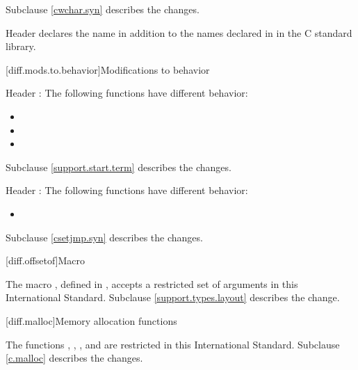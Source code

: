 Subclause \ref{cwchar.syn} describes the changes.

\pnum
Header 
declares the name  in addition to the names declared in
 in the C standard library.

[diff.mods.to.behavior]{Modifications to behavior}

\pnum
Header :
The following functions have different behavior:

\begin{itemize}
\item {}
\item {}
\item {}
\end{itemize}

Subclause \ref{support.start.term} describes the changes.

\pnum
Header :
The following functions have different behavior:

\begin{itemize}
\item {}
\end{itemize}

Subclause \ref{csetjmp.syn} describes the changes.

[diff.offsetof]{Macro }
%

\pnum
The macro , defined in
,
accepts a restricted set of  arguments in this International Standard.
Subclause \ref{support.types.layout} describes the change.

[diff.malloc]{Memory allocation functions}

\pnum
The functions
,
,
,
and
are restricted in this International Standard.
Subclause \ref{c.malloc} describes the changes.
